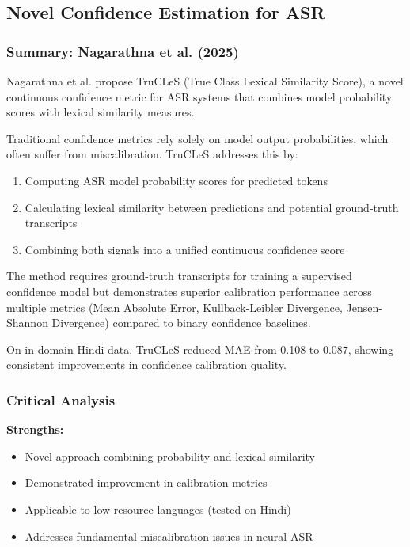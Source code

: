 \subsection{Novel Confidence Estimation for ASR}

\subsubsection{Summary: Nagarathna et al. (2025)}

Nagarathna et al. \cite{nagarathna2025} propose TruCLeS (True Class Lexical Similarity Score), a novel continuous confidence metric for ASR systems that combines model probability scores with lexical similarity measures.

Traditional confidence metrics rely solely on model output probabilities, which often suffer from miscalibration. TruCLeS addresses this by:

\begin{enumerate}
    \item Computing ASR model probability scores for predicted tokens
    \item Calculating lexical similarity between predictions and potential ground-truth transcripts
    \item Combining both signals into a unified continuous confidence score
\end{enumerate}

The method requires ground-truth transcripts for training a supervised confidence model but demonstrates superior calibration performance across multiple metrics (Mean Absolute Error, Kullback-Leibler Divergence, Jensen-Shannon Divergence) compared to binary confidence baselines.

On in-domain Hindi data, TruCLeS reduced MAE from 0.108 to 0.087, showing consistent improvements in confidence calibration quality.

\subsubsection{Critical Analysis}

\textbf{Strengths:}
\begin{itemize}
    \item Novel approach combining probability and lexical similarity
    \item Demonstrated improvement in calibration metrics
    \item Applicable to low-resource languages (tested on Hindi)
    \item Addresses fundamental miscalibration issues in neural ASR
\end{itemize}

